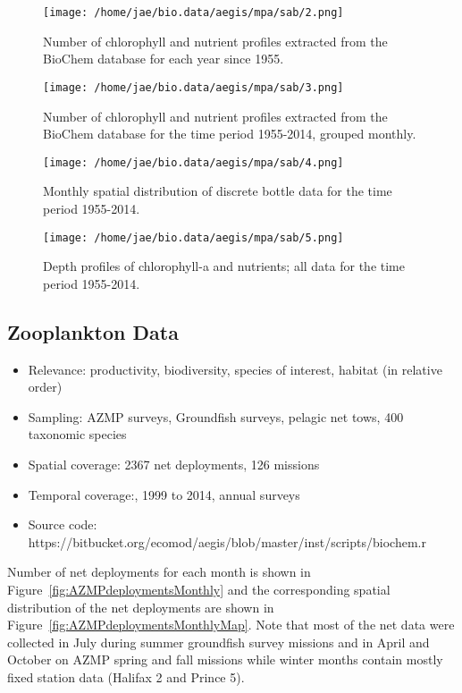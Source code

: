 \documentclass[letterpaper,portrait,11pt]{scrartcl}
\numberwithin{equation}{section}    %
\numberwithin{figure}{section}    %
\numberwithin{table}{section}       %
\begin{document}
\begin{figure}
  \centering
  \texttt{[image: /home/jae/bio.data/aegis/mpa/sab/2.png]}
  \caption{Number of chlorophyll and nutrient profiles extracted from the BioChem database for each year since 1955.}
  \label{fig:ChloroMap}
\end{figure}

\begin{figure}
  \centering
  \texttt{[image: /home/jae/bio.data/aegis/mpa/sab/3.png]}
  \caption{Number of chlorophyll and nutrient profiles extracted from the BioChem database for the time period 1955-2014, grouped monthly.}
  \label{fig:ChloroFreq}
\end{figure}

\begin{figure}[h]
  \centering
  \texttt{[image: /home/jae/bio.data/aegis/mpa/sab/4.png]}
  \caption{Monthly spatial distribution of discrete bottle data for the time period 1955-2014.}
  \label{fig:BottleMap}
\end{figure}

\begin{figure}
  \centering
  \texttt{[image: /home/jae/bio.data/aegis/mpa/sab/5.png]}
  \caption{Depth profiles of chlorophyll-a and nutrients; all data for the time period 1955-2014.}
  \label{fig:ChloroProfiles}
\end{figure}


\subsection{Zooplankton Data}

\begin{itemize}  
  \item Relevance:  productivity, biodiversity, species of interest, habitat (in relative order)
  \item Sampling:  AZMP surveys, Groundfish surveys, pelagic net tows, 400 taxonomic species
  \item Spatial coverage: 2367 net deployments, 126 missions 
  \item Temporal coverage:,  1999 to 2014, annual surveys
  \item Source code: https://bitbucket.org/ecomod/aegis/blob/master/inst/scripts/biochem.r
\end{itemize}

Number of net deployments for each month is shown in Figure~\ref{fig:AZMPdeploymentsMonthly} and the corresponding spatial distribution of the net deployments are shown in Figure~\ref{fig:AZMPdeploymentsMonthlyMap}. Note that most of the net data were collected in July during summer groundfish survey missions and in April and October on AZMP spring and fall missions while winter months contain mostly fixed station data (Halifax 2 and Prince 5).
\end{document}
